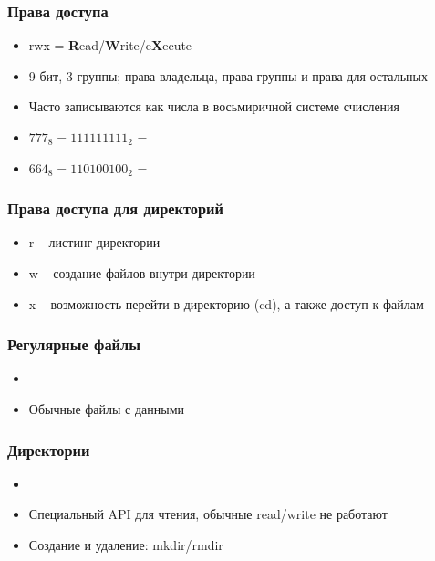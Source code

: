     \subsubsection{Права доступа}
      \begin{itemize}
        \item rwx = \textbf{R}ead/\textbf{W}rite/e\textbf{X}ecute
        \item 9 бит, 3 группы; права владельца, права группы и права для остальных
        \item Часто записываются как числа в восьмиричной системе счисления
        \item $777_8 = 111111111_2$ = 
        \item $664_8 = 110100100_2$ = 
      \end{itemize}
    
    \subsubsection{Права доступа для директорий}
      \begin{itemize}
        \item r -- листинг директории
        \item w -- создание файлов внутри директории
        \item x -- возможность перейти в директорию (cd),  а также доступ к файлам
      \end{itemize}
    
    \subsubsection{Регулярные файлы}
      \begin{itemize}
        \item {}
        \item Обычные файлы с данными
      \end{itemize}
    
    \subsubsection{Директории}
      \begin{itemize}
        \item {}
        \item Специальный API для чтения, обычные read/write не работают
        \item Создание и удаление: mkdir/rmdir
      \end{itemize}
    
